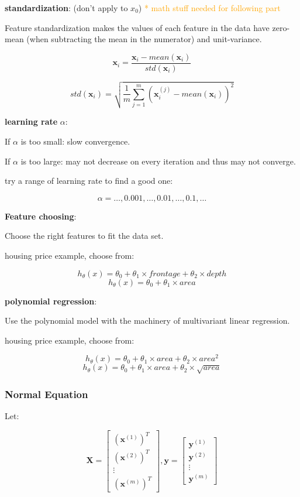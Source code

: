 \documentclass{article}
\begin{document}
\noindent \textbf{standardization}: (don't apply to \(x_0\)) \textcolor{orange}{ * math stuff needed for following part}

\noindent Feature standardization makes the values of each feature in the data have zero-mean (when subtracting the mean in the numerator) and unit-variance.

\[\textbf{x}_i = \frac{\textbf{x}_i - mean(\textbf{x}_i)}{std(\textbf{x}_i)}\]

\[std(\textbf{x}_i) = \sqrt{ \frac{1}{m} \sum_{j = 1}^m (\textbf{x}^{(j)}_i - mean(\textbf{x}_i))^2}\]

\noindent \textbf{learning rate} \(\alpha\):

\noindent If \(\alpha\) is too small: slow convergence.

\noindent If \(\alpha\) is too large: may not decrease on every iteration and thus may not converge.

\noindent try a range of learning rate to find a good one:

\[\alpha = \dots, 0.001, \dots, 0.01, \dots, 0.1, \dots\]

\noindent \textbf{Feature choosing}:

\noindent Choose the right features to fit the data set.

\noindent housing price example, choose from:

\[h_{\theta}(x) = \theta_0 + \theta_1 \times frontage + \theta_2 \times depth\]
\[h_{\theta}(x) = \theta_0 + \theta_1 \times area\]

\noindent \textbf{polynomial regression}:

\noindent Use the polynomial model with the machinery of multivariant linear regression.

\noindent housing price example, choose from:

\[h_{\theta}(x) = \theta_0 + \theta_1 \times area + \theta_2 \times area^2\]
\[h_{\theta}(x) = \theta_0 + \theta_1 \times area + \theta_2 \times \sqrt{area}\]

\subsubsection{Normal Equation}

\noindent Let:

\[
\textbf{X} = 
\begin{bmatrix}
(\textbf{x}^{(1)})^T\\
(\textbf{x}^{(2)})^T\\
\vdots\\
(\textbf{x}^{(m)})^T
\end{bmatrix}
,
\textbf{y} = 
\begin{bmatrix}
\textbf{y}^{(1)}\\
\textbf{y}^{(2)}\\
\vdots\\
\textbf{y}^{(m)}
\end{bmatrix}
\]
\end{document}
